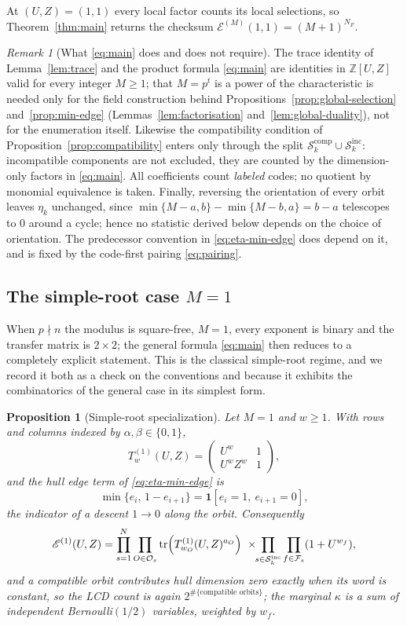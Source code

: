 \documentclass[11pt,a4paper]{article}
\newcommand{\Fs}{\mathcal F_s}
\newcommand{\Os}{\mathcal O_s}
\newcommand{\Epoly}{\mathscr E}
\numberwithin{equation}{section}
\theoremstyle{plain}
\newtheorem{proposition}[theorem]{Proposition}
\theoremstyle{definition}
\theoremstyle{remark}
\newtheorem{remark}[theorem]{Remark}
\begin{document}
At $(U,Z)=(1,1)$ every local factor counts its local selections, so
Theorem~\ref{thm:main} returns the checksum
$\Epoly^{(M)}(1,1)=(M+1)^{N_F}$.

\begin{remark}[What \eqref{eq:main} does and does not require]
\label{rem:hypotheses}
The trace identity of Lemma~\ref{lem:trace} and the product formula
\eqref{eq:main} are identities in $\mathbb{Z}[U,Z]$ valid for every integer
$M\geq1$; that $M=p^t$ is a power of the characteristic is needed only for the
field construction behind Propositions~\ref{prop:global-selection}
and~\ref{prop:min-edge} (Lemmas~\ref{lem:factorisation}
and~\ref{lem:global-duality}), not for the enumeration itself. Likewise the
compatibility condition of Proposition~\ref{prop:compatibility} enters only
through the split $\mathcal{S}_k^{\mathrm{comp}}\cup\mathcal{S}_k^{\mathrm{inc}}$:
incompatible components are not excluded, they are counted by the
dimension-only factors in \eqref{eq:main}. All coefficients count \emph{labeled}
codes; no quotient by monomial equivalence is taken. Finally, reversing the
orientation of every orbit leaves $\eta_k$ unchanged, since
$\min\{M-a,b\}-\min\{M-b,a\}=b-a$ telescopes to $0$ around a cycle; hence no
statistic derived below depends on the choice of orientation. The predecessor
convention in \eqref{eq:eta-min-edge} does depend on it, and is fixed by the
code-first pairing \eqref{eq:pairing}.
\end{remark}

\subsection{The simple-root case \texorpdfstring{$M=1$}{M=1}}\label{sec:M1}

When $p\nmid n$ the modulus is square-free, $M=1$, every exponent is binary and
the transfer matrix is $2\times2$; the general formula
\eqref{eq:main} then reduces to a completely explicit statement. This is the
classical simple-root regime, and we record it both as a check on the
conventions and because it exhibits the combinatorics of the general case in
its simplest form.

\begin{proposition}[Simple-root specialization]\label{prop:M1}
Let $M=1$ and $w\geq1$. With rows and columns indexed by $\alpha,\beta\in\{0,1\}$,
\[
T^{(1)}_w(U,Z)=
\begin{pmatrix}
U^{w} & 1\\[2pt]
U^{w}Z^{w} & 1
\end{pmatrix},
\]
and the hull edge term of \eqref{eq:eta-min-edge} is
\[
\min\{e_i,\,1-e_{i+1}\}=\mathbf{1}[e_i=1,\ e_{i+1}=0],
\]
the indicator of a \emph{descent} $1\to0$ along the orbit. Consequently
\[
\Epoly^{(1)}(U,Z)
=\prod_{s=1}^{N}\prod_{O\in\Os}\operatorname{tr}
 \Bigl(T^{(1)}_{w_O}(U,Z)^{a_O}\Bigr)
\ \times\!\!\prod_{s\in\mathcal{S}_k^{\mathrm{inc}}}\prod_{f\in\Fs}(1+U^{w_f}),
\]
and a compatible orbit contributes hull dimension zero exactly when its word is
constant, so the LCD count is again $2^{\#\{\text{compatible orbits}\}}$; the
marginal $\kappa$ is a sum of independent Bernoulli$(1/2)$ variables, weighted
by $w_f$.
\end{proposition}
\end{document}
